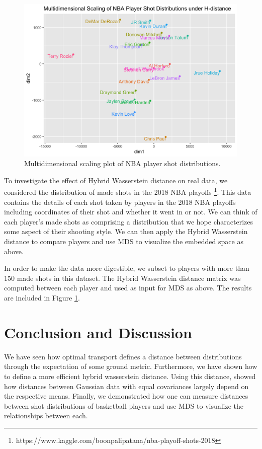 \documentclass[11pt, a4paper, fleqn]{article}
\numberwithin{equation}{section}
\numberwithin{figure}{section}
\numberwithin{table}{section}
\begin{document}
\begin{figure}[t]
\centering
\includegraphics[width=\linewidth]{NBAMDSPlot}
\caption{Multidimensional scaling plot of NBA player shot distributions.}
\label{fig:nba}
\end{figure}


To investigate the effect of Hybrid Wasserstein distance on real data, we considered the distribution of made shots in the 2018 NBA playoffs \footnote{https://www.kaggle.com/boonpalipatana/nba-playoff-shots-2018}. This data contains the details of each shot taken by players in the 2018 NBA playoffs including coordinates of their shot and whether it went in or not. We can think of each player's made shots as comprising a distribution that we hope characterizes some aspect of their shooting style. We can then apply the Hybrid Wasserstein distance to compare players and use MDS to visualize the embedded space as above.

In order to make the data more digestible, we subset to players with more than 150 made shots in this dataset. The Hybrid Wasserstein distance matrix was computed between each player and used as input for MDS as above. The results are included in Figure \ref{fig:nba}. 

\section{Conclusion and Discussion}\label{sec:discussion}
We have seen how optimal transport defines a distance between distributions through the expectation of some ground metric. Furthermore, we have shown how to define a more efficient hybrid wasserstein distance. Using this distance, showed how distances between Gaussian data with equal covariances largely depend on the respective means. Finally, we demonstrated how one can measure distances between shot distributions of basketball players and use MDS to visualize the relationships between each.
\end{document}
